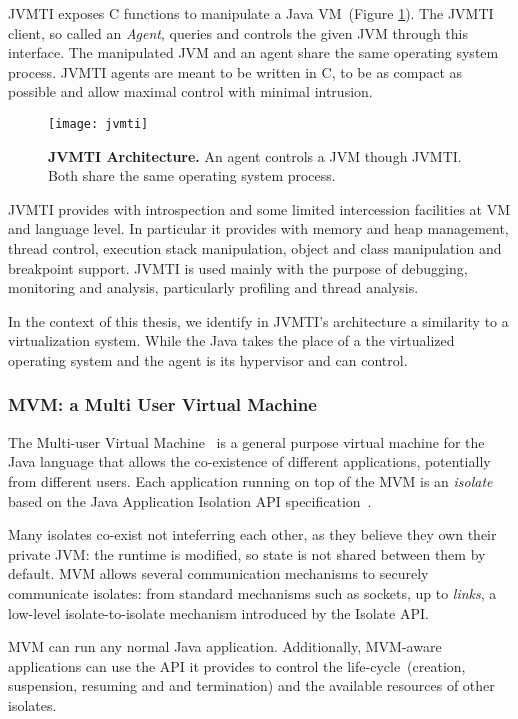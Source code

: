 JVMTI exposes C functions to manipulate a Java VM~(Figure \ref{fig:jvmti}). The JVMTI client, so called an \emph{Agent}, queries and controls the given JVM through this interface. The manipulated JVM and an agent share the same operating system process. JVMTI agents are meant to be written in C, to be as compact as possible and allow maximal control with minimal intrusion.

\begin{figure}[ht]
\begin{center}
\texttt{[image: jvmti]}
\caption{\textbf{JVMTI Architecture.} An agent controls a JVM though JVMTI. Both share the same operating system process.\label{fig:jvmti}}
\end{center}
\end{figure}

JVMTI provides with introspection and some limited intercession facilities at VM and language level. In particular it provides with memory and heap management, thread control, execution stack manipulation, object and class manipulation and breakpoint support. JVMTI is used mainly with the purpose of debugging, monitoring and analysis, particularly profiling and thread analysis.

In the context of this thesis, we identify in JVMTI's architecture a similarity to a virtualization system. While the Java \VM takes the place of a the virtualized operating system and the agent is its hypervisor and can control.

\subsubsection*{MVM: a Multi User Virtual Machine}
The Multi-user Virtual Machine~\cite{Czaj03a,Czaj01a} is a general purpose virtual machine for the Java language that allows the co-existence of different applications, potentially from different users. Each application running on top of the MVM is an \emph{isolate} based on the Java Application Isolation API specification~\cite{JSR121}.

Many isolates co-exist not inteferring each other, as they believe they own their private JVM: the runtime is modified, so state is not shared between them by default. MVM allows several communication mechanisms to securely communicate isolates: from standard mechanisms such as sockets, up to \emph{links}, a low-level isolate-to-isolate mechanism introduced by the Isolate API.

MVM can run any normal Java application. Additionally, MVM-aware applications can use the API it provides to control the life-cycle~(\eg creation, suspension, resuming and and termination) and the available resources of other isolates.


